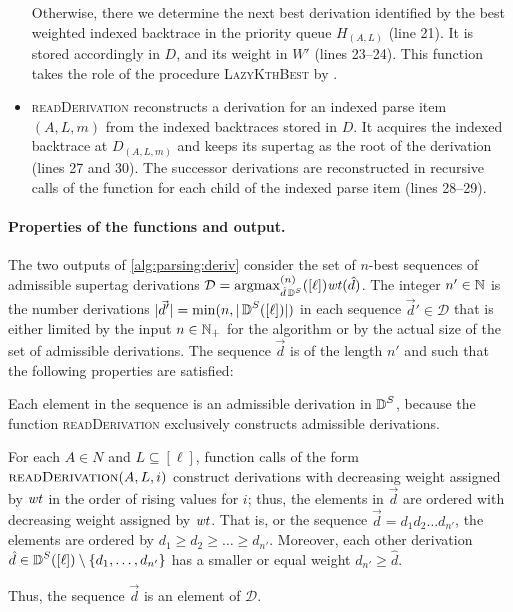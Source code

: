 \documentclass[../../document.tex]{subfiles}
\begin{document}
\begin{itemize}
            Otherwise, there we determine the next best derivation identified by the best weighted indexed backtrace in the priority queue \(H_{(A, L)}\) (line 21).
            It is stored accordingly in \(D\), and its weight in \(W'\) (lines 23--24).
            This function takes the role of the procedure \textsc{LazyKthBest} by .
        \item \textsc{readDerivation} reconstructs a derivation for an indexed parse item \((A, L, m)\) from the indexed backtraces stored in \(D\).
            It acquires the indexed backtrace at \(D_{(A, L, m)}\) and keeps its supertag as the root of the derivation (lines 27 and 30).
            The successor derivations are reconstructed in recursive calls of the function for each child of the indexed parse item (lines 28--29).
    \end{itemize}

    \paragraph{Properties of the functions and output.}
    The two outputs of \cref{alg:parsing:deriv} consider the set of \(n\)-best sequences of admissible  supertag derivations \(\mathcal{D} = \operatorname{arg max}^{(n)}_{\hat{d} \operatorname{\mathbb{D}}^S}([\ell]) \mathit{wt}(\hat{d})\).
    The integer \(n' \in \mathbb{N}\) is the number derivations \(|\vec{d}'| = \min(n, |\operatorname{\mathbb{D}}^S([\ell])|)\) in each sequence \(\vec{d}' \in \mathcal{D}\) that is either limited by the input \(n \in \mathbb{N}_+\) for the algorithm or by the actual size of the set of admissible derivations.
    The sequence \(\vec{d}\) is of the length \(n'\) and such that the following properties are satisfied:
    \begin{compactitem}
        \item Each element in the sequence is an admissible derivation in \(\operatorname{\mathbb{D}}^S\), because the function \textsc{readDerivation} exclusively constructs admissible derivations.
        \item For each \(A\in N\) and \(L \subseteq [\ell]\), function calls of the form \(\Call{readDerivation}{A, L, i}\) construct derivations with decreasing weight assigned by \(\mathit{wt}\) in the order of rising values for \(i\); thus, the elements in $\vec{d}$ are ordered with decreasing weight assigned by \(\mathit{wt}\). That is, or the sequence \(\vec{d} = d_1 d_2 \ldots d_{n'}\), the elements are ordered by \(d_1 \geq d_2 \geq \ldots \geq d_{n'}\). Moreover, each other derivation \(\hat{d} \in \operatorname{\mathbb{D}}^S([\ell]) \setminus \{d_1, \ldots, d_{n'}\}\) has a smaller or equal weight \(d_{n'} \geq \hat{d}\).
    \end{compactitem}
    Thus, the sequence \(\vec{d}\) is an element of \(\mathcal{D}\).
\end{document}
